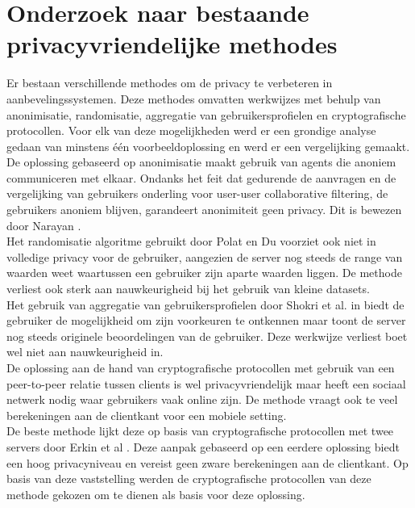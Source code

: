 \documentclass[twocolumn]{phdsymp} %
\begin{document}
\section{Onderzoek naar bestaande privacyvriendelijke methodes}
Er bestaan verschillende methodes om de privacy te verbeteren in aanbevelingssystemen. Deze methodes omvatten werkwijzes met behulp van anonimisatie, randomisatie, aggregatie van gebruikersprofielen en cryptografische protocollen. Voor elk van deze mogelijkheden werd er een grondige analyse gedaan van minstens \'e\'en voorbeeldoplossing en werd er een vergelijking gemaakt. \\ De oplossing gebaseerd op anonimisatie \cite{anonimisatie} maakt gebruik van agents die anoniem communiceren met elkaar. Ondanks het feit dat gedurende de aanvragen en de vergelijking van gebruikers onderling voor user-user collaborative filtering, de gebruikers anoniem blijven, garandeert anonimiteit geen privacy. Dit is bewezen door Narayan \cite{anon}.\\Het randomisatie algoritme gebruikt door Polat en Du \cite{rand} voorziet ook niet in volledige privacy voor de gebruiker, aangezien de server nog steeds de range van waarden weet waartussen een gebruiker zijn aparte waarden liggen. De methode verliest ook sterk aan nauwkeurigheid bij het gebruik van kleine datasets.\\  Het gebruik van aggregatie van gebruikersprofielen door Shokri et al. in \cite{agg} biedt de gebruiker de mogelijkheid om zijn voorkeuren te ontkennen maar toont de server nog steeds originele beoordelingen van de gebruiker. Deze werkwijze verliest boet wel niet aan nauwkeurigheid in. \\ De oplossing aan de hand van cryptografische protocollen met gebruik van een peer-to-peer  relatie tussen clients \cite{social} is wel privacyvriendelijk maar heeft een sociaal netwerk nodig waar gebruikers vaak online zijn. De methode vraagt ook te veel berekeningen aan de clientkant voor een mobiele setting.\\ De beste methode lijkt deze op basis van cryptografische protocollen met twee servers door Erkin et al \cite{dyn}. Deze aanpak gebaseerd op een eerdere oplossing \cite{erkin} biedt een hoog privacyniveau en vereist geen zware berekeningen aan de clientkant. Op basis van deze vaststelling werden de cryptografische protocollen van deze methode gekozen om te dienen als basis voor deze oplossing.
\end{document}
